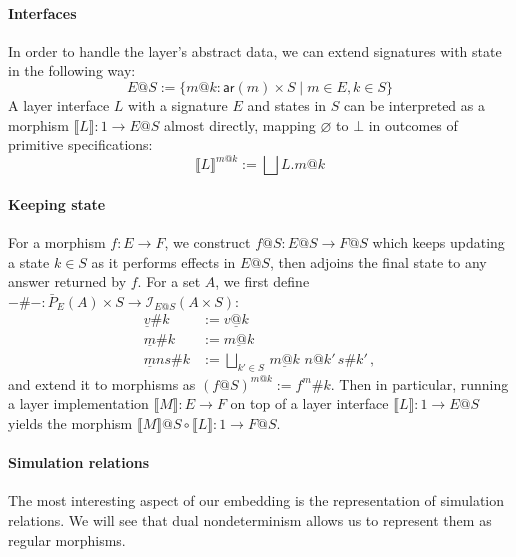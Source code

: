 \documentclass[draft,11pt]{report}
\newcommand{\kw}[1]{\ensuremath{ \mathsf{#1} }}
\begin{document}
\paragraph{Interfaces}
In order to handle the layer's abstract data,
we can extend signatures with state in the following way:
\[
  E@S :=
    \{ m@k : \kw{ar}(m) \times S \mid
       m \in E, k \in S \}
\]
A layer interface $L$ with a signature $E$
and states in $S$
can be interpreted as
a morphism $\llbracket L \rrbracket : 1 \rightarrow E@S$
almost directly,
mapping $\varnothing$ to $\bot$
in outcomes of primitive specifications:
\[
  \llbracket L \rrbracket^{m@k} :=
    \bigsqcup L.m@k
\]

\paragraph{Keeping state}
For a morphism $f : E \rightarrow F$,
we construct $f@S : E@S \rightarrow F@S$
which keeps updating a state $k \in S$
as it performs effects in $E@S$,
then adjoins the final state to any answer
returned by $f$.
For a set $A$, we first define
$-\#- : \bar{P}_E(A) \times S \rightarrow \mathcal{I}_{E@S}(A \times S)$:
\begin{align*}
  \underline{v}\#k &:= \underline{v@k} \\
  \underline{m}\#k &:= \underline{m@k} \\
  \underline{m}ns\#k &:=
    \bigsqcup_{k' \in S} \, \underline{m@k} \,\, n@k' \, s\#k' \,,
\end{align*}
and extend it to morphisms as $(f@S)^{m@k} := f^m\#k$.
Then in particular,
running a layer implementation
$\llbracket M \rrbracket : E \rightarrow F$
on top of a layer interface
$\llbracket L \rrbracket : 1 \rightarrow E@S$
yields the morphism
$\llbracket M \rrbracket @ S \circ \llbracket L \rrbracket :
 1 \rightarrow F@S$.

\paragraph{Simulation relations}

The most interesting aspect of our embedding
is the representation of simulation relations.
We will see that dual nondeterminism
allows us to represent them as regular morphisms.
\end{document}
